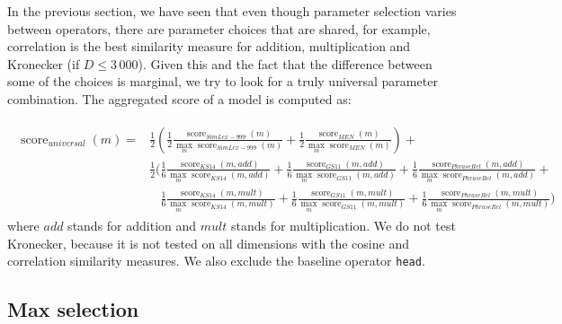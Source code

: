 In the previous section, we have seen that even though parameter selection varies between operators, there are parameter choices that are shared, for example, correlation is the best similarity measure for addition, multiplication and Kronecker (if $D \le 3\,000$). Given this and the fact that the difference between some of the choices is marginal, we try to look for a truly universal parameter combination. The aggregated score of a model is computed as:

{\scriptsize
\begin{align}
  \begin{split}
\operatorname{score}_\mathit{universal}(\mathit{m}) = &%
\frac{1}{2}\left(
\frac{1}{2}%
\frac{\operatorname{score}_\mathit{SimLex-999}(\mathit{m})}%
{\max_m\operatorname{score}_\mathit{SimLex-999}(m)}%
+%
\frac{1}{2}%
\frac{\operatorname{score}_\mathit{MEN}(\mathit{m})}%
{\max_m\operatorname{score}_\mathit{MEN}(m)}%
\right)+
\\
&\frac{1}{2}\Bigg(
\frac{1}{6}%
\frac{\operatorname{score}_\mathit{KS14}(\mathit{m}, \mathit{add})}%
{\max_m\operatorname{score}_\mathit{KS14}(m, \mathit{add})}%
+%
\frac{1}{6}%
\frac{\operatorname{score}_\mathit{GS11}(\mathit{m}, \mathit{add})}%
{\max_m\operatorname{score}_\mathit{GS11}(m, \mathit{add})}%
+%
\frac{1}{6}%
\frac{\operatorname{score}_\mathit{PhraseRel}(\mathit{m, \mathit{add}})}%
{\max_m\operatorname{score}_\mathit{PhraseRel}(m, \mathit{add})}
+
\\
&\phantom{\frac{1}{2}\Bigg(}
\frac{1}{6}%
\frac{\operatorname{score}_\mathit{KS14}(\mathit{m}, \mathit{mult})}%
{\max_m\operatorname{score}_\mathit{KS14}(m, \mathit{mult})}%
+%
\frac{1}{6}%
\frac{\operatorname{score}_\mathit{GS11}(\mathit{m}, \mathit{mult})}%
{\max_m\operatorname{score}_\mathit{GS11}(m, \mathit{mult})}%
+%
\frac{1}{6}%
\frac{\operatorname{score}_\mathit{PhraseRel}(\mathit{m, \mathit{mult}})}%
{\max_m\operatorname{score}_\mathit{PhraseRel}(m, \mathit{mult})}
\Bigg)
\end{split}
\end{align}
\normalsize
}
where $\mathit{add}$ stands for addition and $\mathit{mult}$ stands for multiplication. We do not test Kronecker, because it is not tested on all dimensions with the cosine and correlation similarity measures. We also exclude the baseline operator \texttt{head}.

\subsection{Max selection}
\label{sec:max-selection-single}

